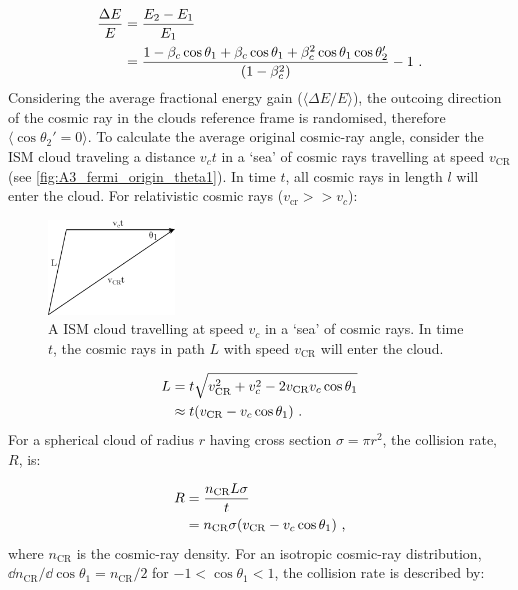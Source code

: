 \begin{equation}
    \begin{aligned}
        \frac{\Delta E}{E}&=\frac{E_2-E_1}{E_1} \\
        &=\frac{1-\beta_c\cos\theta_1+\beta_c\cos\theta_1+\beta_c^2\cos\theta_1\cos\theta_2'}{\qty(1-\beta_c^2)}-1\text{ .}
    \end{aligned} \label{eq:A3_DSA_fermi_orig_frac_energy}
\end{equation}
\noindent Considering the average fractional energy gain ($\langle \Delta E/E \rangle$), the outcoing direction of the cosmic ray in the clouds reference frame is randomised, therefore $\langle \cos\theta_2'=0 \rangle$. To calculate the average original cosmic-ray angle, consider the ISM cloud traveling a distance $v_ct$ in a `sea' of cosmic rays travelling at speed $v_\text{CR}$ (see \autoref{fig:A3_fermi_origin_theta1}). In time $t$, all cosmic rays in length $l$ will enter the cloud. For relativistic cosmic rays ($v_\text{cr}>>v_c$):
\begin{figure}
    \centering
    \includegraphics[width=0.3\textwidth]{A3_Diffusive_Shock_Acceleration/Images/fermi_original_theta1.png}
    \caption{A ISM cloud travelling at speed $v_c$ in a `sea' of cosmic rays. In time $t$, the cosmic rays in path $L$ with speed $v_\text{CR}$ will enter the cloud.}
    \label{fig:A3_fermi_origin_theta1}
\end{figure}
\begin{equation}
    \begin{aligned}
        L&=t\sqrt{v_\text{CR}^2+v_c^2-2v_\text{CR}v_c\cos\theta_1} \\
        &\approx t\qty(v_\text{CR}-v_c\cos\theta_1) \text{ .}
    \end{aligned}
\end{equation}
\noindent For a spherical cloud of radius $r$ having cross section $\sigma=\pi r^2$, the collision rate, $R$, is:

\begin{equation}
    \begin{aligned}
        R&=\frac{n_\text{CR}L\sigma}{t} \\
        &=n_\text{CR}\sigma\qty(v_\text{CR}-v_c\cos\theta_1) \text { ,}
    \end{aligned}
\end{equation}
\noindent where $n_\text{CR}$ is the cosmic-ray density. For an isotropic cosmic-ray distribution, $\dd{n_\text{CR}}/\dd{\cos\theta_1}=n_\text{CR}/2$ for $-1<\cos\theta_1<1$, the collision rate is described by:

